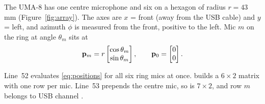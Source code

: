 \documentclass[11pt]{article}
\begin{document}

The UMA-8 has one centre microphone and six on a hexagon of radius $r=43$\,mm
(Figure~\ref{fig:array}). The axes are $x$ = front (away from the USB cable) and $y$ = left,
and azimuth $\phi$ is measured from the front, positive to the left. Mic $m$ on the ring at
angle $\theta_m$ sits at
\begin{equation}\label{eq:positions}
  \mathbf{p}_m = r\begin{bmatrix}\cos\theta_m\\ \sin\theta_m\end{bmatrix},\qquad
  \mathbf{p}_0=\begin{bmatrix}0\\0\end{bmatrix}.
\end{equation}


Line~52 evaluates \eqref{eq:positions} for all six ring mics at once.
 builds a $6\times2$ matrix with one row per mic.
Line~53 prepends the centre mic, so  is $7\times 2$, and row $m$ belongs to
USB channel .
\end{document}

